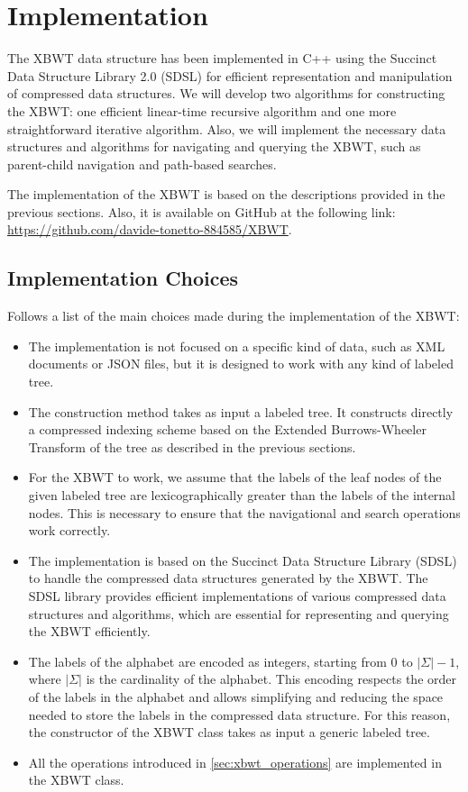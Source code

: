 \section{Implementation}
The XBWT data structure has been implemented in C++ using the Succinct Data Structure Library 2.0 (SDSL) for efficient representation and manipulation of compressed data structures. We will develop two algorithms for constructing the XBWT: one efficient linear-time recursive algorithm and one more straightforward iterative algorithm. Also, we will implement the necessary data structures and algorithms for navigating and querying the XBWT, such as parent-child navigation and path-based searches. 

The implementation of the XBWT is based on the descriptions provided in the previous sections. Also, it is available on GitHub at the following link: \url{https://github.com/davide-tonetto-884585/XBWT}.

\subsection{Implementation Choices}
Follows a list of the main choices made during the implementation of the XBWT:
\begin{itemize}
    \item The implementation is not focused on a specific kind of data, such as XML documents or JSON files, but it is designed to work with any kind of labeled tree. 
    \item The construction method takes as input a labeled tree. It constructs directly a compressed indexing scheme based on the Extended Burrows-Wheeler Transform of the tree as described in the previous sections.
    \item For the XBWT to work, we assume that the labels of the leaf nodes of the given labeled tree are lexicographically greater than the labels of the internal nodes. This is necessary to ensure that the navigational and search operations work correctly.  
    \item The implementation is based on the Succinct Data Structure Library (SDSL) to handle the compressed data structures generated by the XBWT. The SDSL library provides efficient implementations of various compressed data structures and algorithms, which are essential for representing and querying the XBWT efficiently.
    \item The labels of the alphabet are encoded as integers, starting from 0 to $|\Sigma| - 1$, where $|\Sigma|$ is the cardinality of the alphabet. This encoding respects the order of the labels in the alphabet and allows simplifying and reducing the space needed to store the labels in the compressed data structure. For this reason, the constructor of the XBWT class takes as input a generic labeled tree.
    \item All the operations introduced in \cref{sec:xbwt_operations} are implemented in the XBWT class.
\end{itemize}

